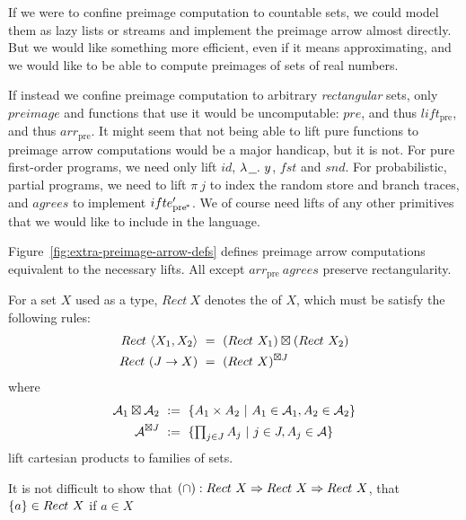\documentclass[preprint]{sigplanconf}
\newcommand{\arrowlift}{\ensuremath{lift}}
\newcommand{\arrowarr}{\ensuremath{arr}}
\newcommand{\arrowif}{\ensuremath{ifte}}
\newcommand{\pre}{_\mathrm{pre}}
\newcommand{\liftpre}{\arrowlift\pre}
\newcommand{\arrpre}{\arrowarr\pre}
\newcommand{\ppre}{_\mathrm{pre^{\mspace{-2mu}*}}}
\newcommand{\ifppre}{\arrowif\ppre}
\begin{document}
If we were to confine preimage computation to countable sets, we could model them as lazy lists or streams and implement the preimage arrow almost directly.
But we would like something more efficient, even if it means approximating, and we would like to be able to compute preimages of sets of real numbers.

If instead we confine preimage computation to arbitrary \emph{rectangular} sets, only $preimage$ and functions that use it would be uncomputable: $pre$, and thus $\liftpre$, and thus $\arrpre$.
It might seem that not being able to lift pure functions to preimage arrow computations would be a major handicap, but it is not.
For pure first-order programs, we need only lift $id$, $\lambda\mspace{2mu}{\underline{\ \ }}\ldotp\,{y}$, $fst$ and $snd$.
For probabilistic, partial programs, we need to lift $\pi~j$ to index the random store and branch traces, and $agrees$ to implement $\ifppre'$.
We of course need lifts of any other primitives that we would like to include in the language.

Figure~\ref{fig:extra-preimage-arrow-defs} defines preimage arrow computations equivalent to the necessary lifts.
All except $\arrpre~agrees$ preserve rectangularity.

\begin{definition}
For a set $X$ used as a type, $Rect~X$ denotes the  of $X$, which must be satisfy the following rules:
\begin{align}
	Rect~\langle{X_1,X_2}\rangle &\ = \ (Rect~X_1) \boxtimes (Rect~X_2)
	\label{eqn:standard-rect-finite-product-rule}
\\
	Rect~(J \to X) &\ = \ (Rect~X)^{\boxtimes J}
	\label{eqn:standard-rect-arbitrary-product-rule}
\end{align}
where
\begin{align}
	\mathcal{A}_1 \boxtimes \mathcal{A}_2 &\ := \ \lbrace {A_1 \times A_2} \ \lvert\ {A_1 \in \mathcal{A}_1, A_2 \in \mathcal{A}_2} \rbrace \\
	\mathcal{A}^{\boxtimes J} &\ := \ \lbrace {\textstyle\prod_{j \in J} A_j} \ \lvert\ {j \in J, A_j \in \mathcal{A}} \rbrace
\end{align}
lift cartesian products to families of sets.
\label{def:standard-rectangle}
\end{definition}

It is not difficult to show that $(\cap) : Rect~X \Rightarrow Rect~X \Rightarrow Rect~X$, that $\{{a}\} \in Rect~X$ if $a \in X$
\end{document}

